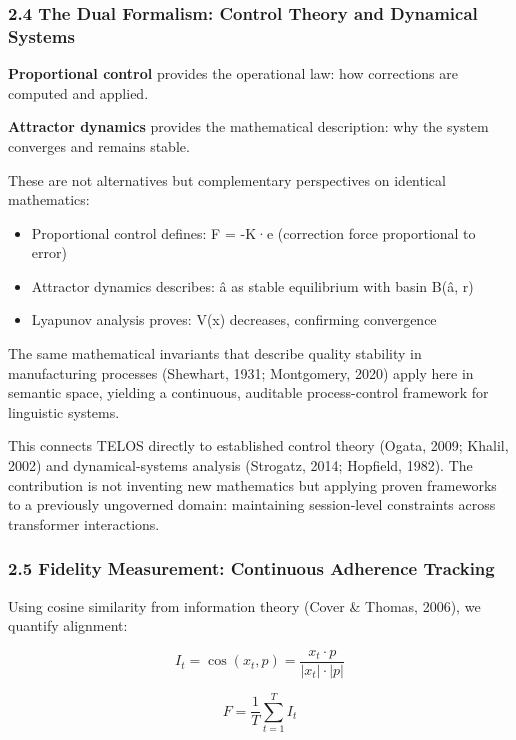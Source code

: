 \subsubsection{2.4 The Dual Formalism: Control Theory and Dynamical
Systems}\label{the-dual-formalism-control-theory-and-dynamical-systems}

\textbf{Proportional control} provides the operational law: how
corrections are computed and applied.

\textbf{Attractor dynamics} provides the mathematical description: why
the system converges and remains stable.

These are not alternatives but complementary perspectives on identical
mathematics:

\begin{itemize}
\tightlist
\item
  Proportional control defines: F = -K·e (correction force proportional
  to error)
\item
  Attractor dynamics describes: â as stable equilibrium with basin B(â,
  r)
\item
  Lyapunov analysis proves: V(x) decreases, confirming convergence
\end{itemize}

The same mathematical invariants that describe quality stability in
manufacturing processes (Shewhart, 1931; Montgomery, 2020) apply here in
semantic space, yielding a continuous, auditable process-control
framework for linguistic systems.

This connects TELOS directly to established control theory (Ogata, 2009;
Khalil, 2002) and dynamical-systems analysis (Strogatz, 2014; Hopfield,
1982). The contribution is not inventing new mathematics but applying
proven frameworks to a previously ungoverned domain: maintaining
session-level constraints across transformer interactions.

\subsubsection{2.5 Fidelity Measurement: Continuous Adherence
Tracking}\label{fidelity-measurement-continuous-adherence-tracking}

Using cosine similarity from information theory (Cover \& Thomas, 2006),
we quantify alignment:

\[I_t = \cos(x_t, p) = \frac{x_t \cdot p}{|x_t| \cdot |p|}\]

\[F = \frac{1}{T} \sum_{t=1}^{T} I_t\]

